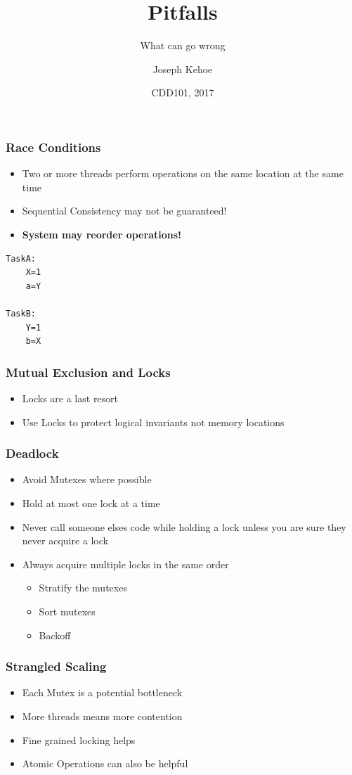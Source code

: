 \documentclass{beamer}
\title[Concurrency] %
{Pitfalls}
\subtitle{What can go wrong}
\author[Dr. Joseph Kehoe] %
{Joseph Kehoe\inst{1}}
\institute[IT Carlow] %
{
	\inst{1}%
	Department of Computing and Networking\\
	Institute of Technology Carlow
}
\date[ITC 2017] %
{CDD101, 2017}
\begin{document}
 
\frame{\titlepage}
 
 

\begin{frame}[fragile]
\frametitle{Race Conditions}
\begin{itemize}
\item Two or more threads perform operations on the same location at the same time
\item Sequential Consistency may not be guaranteed!
\item \textbf{System may reorder operations!}
\end{itemize}
\begin{verbatim}
TaskA:
    X=1
    a=Y

TaskB:
    Y=1
    b=X
\end{verbatim}
\end{frame}


\begin{frame}[fragile]
\frametitle{Mutual Exclusion and Locks}
\begin{itemize}
\item Locks are a last resort
\item Use Locks to protect logical invariants not memory locations
\end{itemize}
\end{frame}


\begin{frame}[fragile]
	\frametitle{Deadlock}
\begin{itemize}
\item Avoid Mutexes where possible
\item Hold at most one lock at a time
\item Never call someone elses code while holding a lock unless you are sure they never acquire a lock
\item Always acquire multiple locks in the same order
\begin{itemize}
\item Stratify the mutexes
\item Sort mutexes
\item Backoff
\end{itemize}

\end{itemize}
\end{frame}

\begin{frame}[fragile]
	\frametitle{Strangled Scaling}
\begin{itemize}
\item Each Mutex is a potential bottleneck
\item More threads means more contention
\item Fine grained locking helps
\item Atomic Operations can also be helpful
\end{itemize}
\end{frame}
\end{document}
